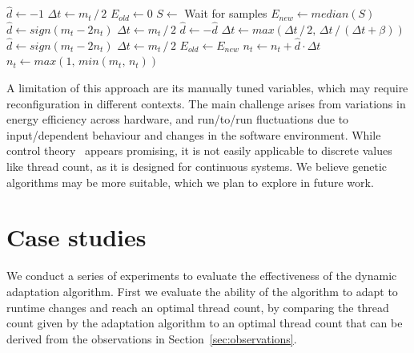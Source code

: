 \begin{algorithm}[!ht]
  \begin{algorithmic}[1]
    \State $\hat{d} \gets -1$
    \State $\Delta t \gets m_t\, /\, 2$
    \State $E_{old} \gets 0$
    \Loop
      \State $S \gets$ Wait for samples
      \State $E_{new} \gets median(S)$
        \State $\hat{d} \gets sign(m_t - 2 n_t)$
        \State $\Delta t \gets m_t\, /\, 2$
      \Else
          \State $\hat{d} \gets -\hat{d}$
        \EndIf
          \State $\Delta t \gets max(\Delta t\, /\, 2,\, \Delta t\, /\, (\Delta t + \beta))$
        \Else
          \State $\hat{d} \gets sign(m_t - 2 n_t)$
          \State $\Delta t \gets m_t\, /\, 2$
        \EndIf
      \EndIf
      \State $E_{old} \gets E_{new}$
      \State $n_t \gets n_t + \hat{d} \cdot \Delta t$
      \State $n_t \gets max(1,\, min(m_t,\, n_t))$
    \EndLoop
  \end{algorithmic}%
  \caption{Algorithm for repeatedly updating the thread count $n_t$ based on energy measurements
  $S$, using step direction $\hat{d}$ and step size $\Delta t$.}
  \label{alg:controller}
\end{algorithm}

A limitation of this approach are its manually tuned variables, which may require reconfiguration in different contexts.
The main challenge arises from variations in energy efficiency across hardware, and run\-/to\-/run fluctuations due to input\-/dependent behaviour and changes in the software environment.
While control theory~\cite{filieri2015software} appears promising, it is not easily applicable to discrete values like thread count, as it is designed for continuous systems.
We believe genetic algorithms may be more suitable, which we plan to explore in future work.

\section{Case studies}\label{sec:evaluation}
We conduct a series of experiments to evaluate the effectiveness of the dynamic adaptation algorithm.
First we evaluate the ability of the algorithm to adapt to runtime changes and reach an optimal thread count, by comparing the thread count given by the adaptation algorithm to an optimal thread count that can be derived from the observations in Section~\ref{sec:observations}.

